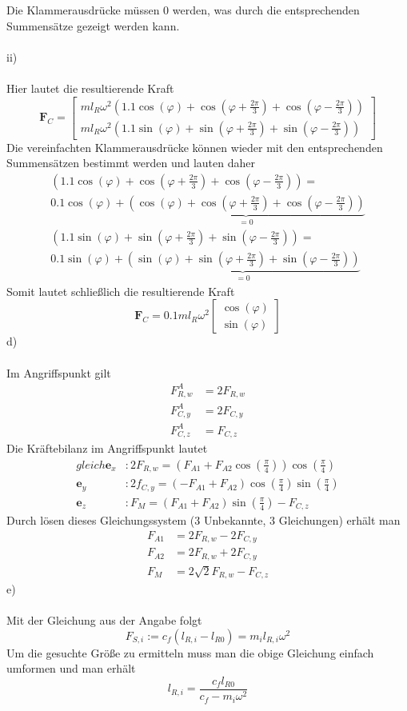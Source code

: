 Die Klammerausdrücke müssen 0 werden, was durch die entsprechenden Summensätze gezeigt werden kann.\\ \\
ii)\\ \\
Hier lautet die resultierende Kraft
\[
	\textbf{F}_C = \begin{bmatrix}
	ml_R\omega^2\left(1.1\cos(\varphi) + \cos(\varphi + \frac{2\pi}{3}) + \cos(\varphi - \frac{2\pi}{3})\right) \\
	ml_R\omega^2\left(1.1\sin(\varphi) + \sin(\varphi + \frac{2\pi}{3}) + \sin(\varphi - \frac{2\pi}{3})\right)
	\end{bmatrix}
\]
Die vereinfachten Klammerausdrücke können wieder mit den entsprechenden Summensätzen bestimmt werden und lauten daher
\begin{align*}
\left(1.1\cos(\varphi) + \cos(\varphi + \frac{2\pi}{3}) + \cos(\varphi - \frac{2\pi}{3})\right) = \\
0.1\cos(\varphi) + \underbrace{\left(\cos(\varphi) + \cos(\varphi + \frac{2\pi}{3}) + \cos(\varphi - \frac{2\pi}{3})\right)}_{=0} \\
\left(1.1\sin(\varphi) + \sin(\varphi + \frac{2\pi}{3}) + \sin(\varphi - \frac{2\pi}{3})\right) = \\
0.1\sin(\varphi) + \underbrace{\left(\sin(\varphi) + \sin(\varphi + \frac{2\pi}{3}) + \sin(\varphi - \frac{2\pi}{3})\right)}_{=0}
\end{align*}
Somit lautet schließlich die resultierende Kraft
\[
	\textbf{F}_C = 0.1ml_R\omega^2\begin{bmatrix}
		\cos(\varphi) \\
		\sin(\varphi)
	\end{bmatrix}
\]
d)\\ \\
Im Angriffspunkt gilt
\begin{align*}
	F_{R,w}^A &= 2F_{R,w} \\
	F_{C,y}^A &= 2F_{C,y} \\
	F_{C,z}^A &= F_{C,z}
\end{align*}
Die Kräftebilanz im Angriffspunkt lautet
\begin{align*}
	gleich\textbf{e}_x &: 2F_{R,w} = (F_{A1} + F_{A2}\cos(\frac{\pi}{4}))\cos(\frac{\pi}{4}) \\
	\textbf{e}_y &: 2f_{C,y} = (-F_{A1} + F_{A2})\cos(\frac{\pi}{4})\sin(\frac{\pi}{4})\\
	\textbf{e}_z &: F_M = (F_{A1} + F_{A2})\sin(\frac{\pi}{4}) - F_{C,z}
\end{align*}
Durch lösen dieses Gleichungssystem (3 Unbekannte, 3 Gleichungen) erhält man
\begin{align*}
	F_{A1} &= 2F_{R,w} - 2F_{C,y} \\
	F_{A2} &= 2F_{R,w} + 2F_{C,y} \\
	F_M &= 2\sqrt{2}F_{R,w} - F_{C,z}
\end{align*}
e)\\ \\
Mit der Gleichung aus der Angabe folgt
\[
	F_{S,i} := c_f(l_{R,i} - l_{R0}) = m_il_{R,i}\omega^2
\]
Um die gesuchte Größe zu ermitteln muss man die obige Gleichung einfach umformen und man erhält
\[
	l_{R,i} = \frac{c_fl_{R0}}{c_f - m_i\omega^2}
\]